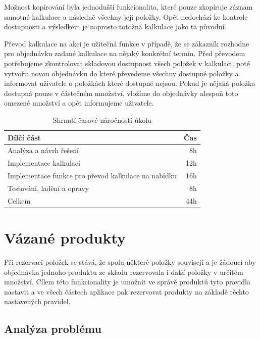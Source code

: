 Možnost kopírování byla jednodušší funkcionalita, které pouze zkopíruje záznam samotné kalkulace a následně všechny její položky. Opět nedochází ke kontrole dostupnosti a výsledkem je naprosto totožná kalkulace jako ta původní.

Převod kalkulace na akci je užitečná funkce v případě, že se zákazník rozhodne pro objednávku zadané kalkulace na nějaký konkrétní termín. Před převodem potřebujeme zkontrolovat skladovou dostupnost všech položek v kalkulaci, poté vytvořit novou objednávku do které převedeme všechny dostupné položky a informovat uživatele  o položkách které dostupné nejsou. Pokud je nějaká položka dostupná pouze v částečném množství, vložíme do objednávky alespoň toto omezené množství a opět informujeme uživatele.


\begin{table}
	\centering
	\caption[Časová náročnost úkolu na kalkulace]{Shrnutí časové náročnosti úkolu}
	\label{tab:TopLevelTableLabel}
		\begin{tabular}{lr}
			\toprule
			Dílčí část & Čas\\
			\midrule
			Analýza a návrh řešení & 8h \\
			Implementace kalkulací & 12h \\
            Implementace funkce pro převod kalkulace na nabídku & 16h \\
            Testování, ladění a opravy & 8h \\
            \midrule
            Celkem  & 44h \\
			\midrule
		\end{tabular}
\end{table}

\section{Vázané produkty}

Při rezervaci položek se stává, že spolu některé položky souvisejí a je žádoucí aby objednávka jednoho produktu ze skladu rezervovala i další položky v určitém množství. Cílem této funkcionality je umožnit ve správě produktů tyto pravidla nastavit a ve všech částech aplikace pak rezervovat produkty na základě těchto nastavených pravidel.

\subsection{Analýza problému}

